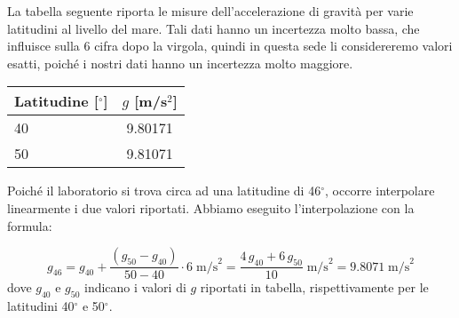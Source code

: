 
La tabella seguente riporta le misure dell'accelerazione di gravità
per varie latitudini al livello del mare. Tali dati hanno un incertezza molto bassa,
che influisce sulla 6 cifra dopo la virgola, quindi in questa sede li considereremo valori esatti,
poiché i nostri dati hanno un incertezza molto maggiore.

\begin{center}
    \begin{tabular}{l c}
        \toprule
        Latitudine [$^\circ$] & $g$ [m/s$^2$] \\
        \midrule
        40 & 9.80171 \\
        50 & 9.81071 \\
        \bottomrule
    \end{tabular}
\end{center}

Poiché il laboratorio si trova circa ad una latitudine di 46$^\circ$, occorre interpolare linearmente i due valori
riportati. Abbiamo eseguito l'interpolazione con la formula:

\begin{equation}
    g_{46} = g_{40} + \frac{(g_{50} - g_{40})}{50 - 40} \cdot 6 \; \text{m/s}^2 = \frac{4\, g_{40} + 6\, g_{50}}{10} \; \text{m/s}^2 =
    9.8071 \; \text{m/s}^2
\end{equation}
%
dove $g_{40}$ e $g_{50}$ indicano i valori di $g$ riportati in tabella, rispettivamente per le latitudini 40$^\circ$ e 50$^\circ$.
